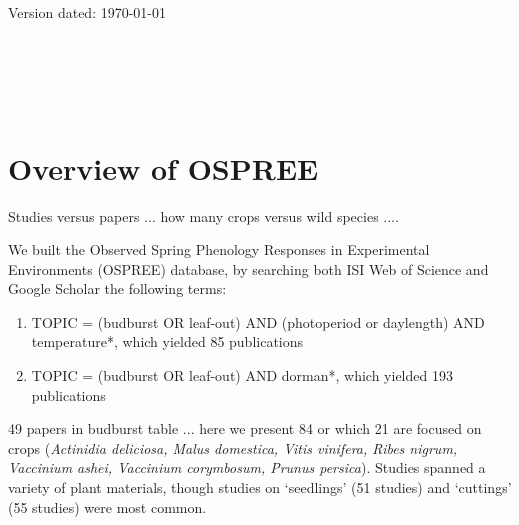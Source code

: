 \documentclass[11pt]{article}
\begin{document}
\renewcommand{\thetable}{S\arabic{table}}
\renewcommand{\thefigure}{S\arabic{figure}}


\renewcommand{\refname}{\CHead{}}
\begin{flushright}
Version dated: \today
\end{flushright}
\bigskip
\medskip
\begin{center}

\\ 
\bigskip

\\ %
\\
\end{center}


\section{Overview of OSPREE}
Studies versus papers ... how many crops versus wild species ....


We built the Observed Spring Phenology Responses in Experimental Environments (OSPREE) database, by searching  both ISI Web of Science and Google Scholar  the following terms: 
\begin{enumerate}
\item TOPIC = (budburst OR leaf-out) AND (photoperiod or daylength) AND temperature*, which yielded 85 publications
\item TOPIC = (budburst OR leaf-out) AND dorman*, which yielded 193 publications
\end{enumerate}

49 papers in budburst table ... here we present 84 or which 21 are focused on crops (\emph{Actinidia deliciosa, Malus domestica, Vitis vinifera, Ribes nigrum, Vaccinium ashei, Vaccinium corymbosum, Prunus persica}). Studies spanned a variety of plant materials, though studies on `seedlings' (51 studies) and `cuttings' (55 studies) were most common. 
\end{document}
